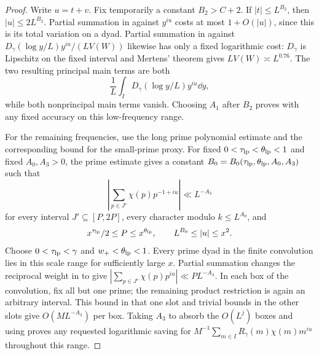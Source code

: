 \begin{proof}
Write \(u=t+v\).  Fix temporarily a constant \(B_2>C+2\).  If
\(|t|\le L^{B_2}\), then \(|u|\le2L^{B_2}\).  Partial summation in
 against \(y^{iu}\) costs at most
\(1+O(|u|)\), since this is its total variation on a dyad.  Partial
summation in  against
\(D_\gamma(\log y/L)y^{iu}/(LV(W))\) likewise has only a fixed
logarithmic cost: \(D_\gamma\) is Lipschitz on the fixed interval and
Mertens' theorem gives \(LV(W)\asymp L^{0.76}\).  The two resulting
principal main terms are both
\[
 \frac1L\int_I D_\gamma(\log y/L)y^{iu}\dd y,
\]
while both nonprincipal main terms vanish.  Choosing \(A_1\) after
\(B_2\) proves  with any
fixed accuracy on this low-frequency range.

For the remaining frequencies, use the long prime polynomial estimate
\cite[Lemma~3.1]{PrimePredecessors} and the corresponding
bound for the small-prime proxy.  For fixed
\(0<\tau_{\rm lp}<\theta_{\rm lp}<1\) and fixed \(A_0,A_3>0\), the
prime estimate gives a constant
\(B_0=B_0(\tau_{\rm lp},\theta_{\rm lp},A_0,A_3)\) such that
\begin{equation}\label{eq:rough-slot-high}
 \left|\sum_{p\in J'}\chi(p)p^{-1+iu}\right|\ll L^{-A_3}
\end{equation}
for every interval \(J'\subseteq[P,2P]\), every character modulo
\(k\le L^{A_0}\), and
\[
 x^{\tau_{\rm lp}}/2\le P\le x^{\theta_{\rm lp}},\qquad L^{B_0}\le|u|\le x^2.
\]
Choose \(0<\tau_{\rm lp}<\gamma\) and \(w_+<\theta_{\rm lp}<1\).  Every prime dyad in the
finite convolution lies in this scale range for sufficiently large \(x\).
Partial summation changes the reciprocal weight in
 to give
\(\left|\sum_{p\in J'}\chi(p)p^{iu}\right|\ll P L^{-A_3}\).
In each box of the convolution, fix all but one prime; the remaining
product restriction is again an arbitrary interval.  This bound in that
one slot and trivial bounds in the other slots give \(O(M L^{-A_3})\)
per box.  Taking \(A_3\) to absorb the \(O(L^j)\) boxes and using
 proves any requested
logarithmic saving for
\(M^{-1}\sum_{m\in I}R_\gamma(m)\chi(m)m^{iu}\) throughout this range.


\end{proof}
